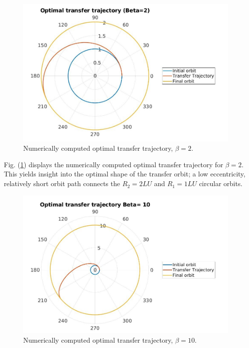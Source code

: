 \begin{figure}[H]
    \includegraphics[width=\linewidth]{./jpgs/thrustArcB2.jpg}
    \caption{Numerically computed optimal transfer trajectory, $\beta = 2$.}
    \label{fig:Tarc-B2}
  \end{figure}

\noindent Fig. (\ref{fig:Tarc-B2}) displays the numerically computed optimal transfer
trajectory for $\beta = 2$. This yields insight into the optimal shape of the transfer orbit; a low 
eccentricity, relatively short orbit path connects the $R_2 = 2 LU$ and $R_1 = 1 LU$ circular orbits.

  \begin{figure}[H]
    \includegraphics[width=\linewidth]{./jpgs/thrustArcB10.jpg}
    \caption{Numerically computed optimal transfer trajectory, $\beta = 10$.}
    \label{fig:Tarc-B10}
  \end{figure}

